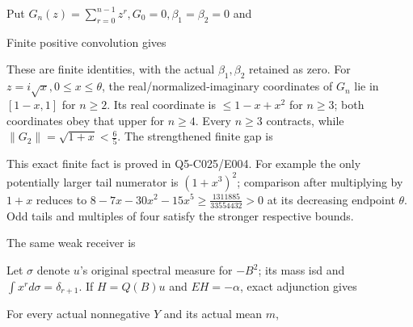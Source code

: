 Put \(G_n(z)=\sum_{r=0}^{n-1}z^r,\allowbreak \allowbreak  G_{0}=0,\allowbreak \allowbreak  \beta_{1}=\beta_{2}=0\) and


Finite positive convolution gives


These are finite identities, with the actual \(\beta_{1},\allowbreak \allowbreak \beta_{2}\) retained as zero. For \(z=i \sqrt{x},\allowbreak \allowbreak 0\le x\le \theta\), the real/normalized-imaginary coordinates of \(G_n\) lie in \([1-x,\allowbreak \allowbreak 1]\) for \(n\ge 2\). Its real coordinate is \(\le 1-x+x^2\) for \(n\ge 3\); both coordinates obey that upper for \(n\ge 4\). Every \(n\ge 3\) contracts, while \(\lVert G_{2}\rVert =\sqrt{1+x}<\frac{6}{5}\). The strengthened finite gap is


This exact finite fact is proved in Q5-C025/E004. For example the only potentially larger tail numerator is \((1+x^3)^2\); comparison after multiplying by \(1+x\) reduces to \(8-7x-30x^2-15x^5\ge \frac{1311885}{33554432}>0\) at its decreasing endpoint \(\theta\). Odd tails and multiples of four satisfy the stronger respective bounds.

The same weak receiver is


Let \(\sigma\) denote \(u\)'s original spectral measure for \(-B^2\); its mass isd and \(\int  x^r d \sigma=\delta_{r+1}\). If \(H=Q(B)u\) and \(EH=-\alpha\), exact adjunction gives


For every actual nonnegative \(Y\) and its actual mean \(m\),

